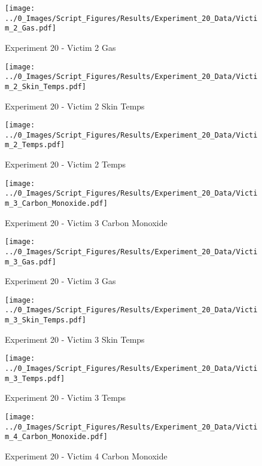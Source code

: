 	\clearpage

	\begin{figure}[H]
		\centering
		\texttt{[image: ../0\_Images/Script\_Figures/Results/Experiment\_20\_Data/Victim\_2\_Gas.pdf]}
		\caption[]{Experiment 20 - Victim 2 Gas}
	\end{figure}
 

	\begin{figure}[H]
		\centering
		\texttt{[image: ../0\_Images/Script\_Figures/Results/Experiment\_20\_Data/Victim\_2\_Skin\_Temps.pdf]}
		\caption[]{Experiment 20 - Victim 2 Skin Temps}
	\end{figure}
 
	\clearpage

	\begin{figure}[H]
		\centering
		\texttt{[image: ../0\_Images/Script\_Figures/Results/Experiment\_20\_Data/Victim\_2\_Temps.pdf]}
		\caption[]{Experiment 20 - Victim 2 Temps}
	\end{figure}
 

	\begin{figure}[H]
		\centering
		\texttt{[image: ../0\_Images/Script\_Figures/Results/Experiment\_20\_Data/Victim\_3\_Carbon\_Monoxide.pdf]}
		\caption[]{Experiment 20 - Victim 3 Carbon Monoxide}
	\end{figure}
 
	\clearpage

	\begin{figure}[H]
		\centering
		\texttt{[image: ../0\_Images/Script\_Figures/Results/Experiment\_20\_Data/Victim\_3\_Gas.pdf]}
		\caption[]{Experiment 20 - Victim 3 Gas}
	\end{figure}
 

	\begin{figure}[H]
		\centering
		\texttt{[image: ../0\_Images/Script\_Figures/Results/Experiment\_20\_Data/Victim\_3\_Skin\_Temps.pdf]}
		\caption[]{Experiment 20 - Victim 3 Skin Temps}
	\end{figure}
 
	\clearpage

	\begin{figure}[H]
		\centering
		\texttt{[image: ../0\_Images/Script\_Figures/Results/Experiment\_20\_Data/Victim\_3\_Temps.pdf]}
		\caption[]{Experiment 20 - Victim 3 Temps}
	\end{figure}
 

	\begin{figure}[H]
		\centering
		\texttt{[image: ../0\_Images/Script\_Figures/Results/Experiment\_20\_Data/Victim\_4\_Carbon\_Monoxide.pdf]}
		\caption[]{Experiment 20 - Victim 4 Carbon Monoxide}
	\end{figure}
 
